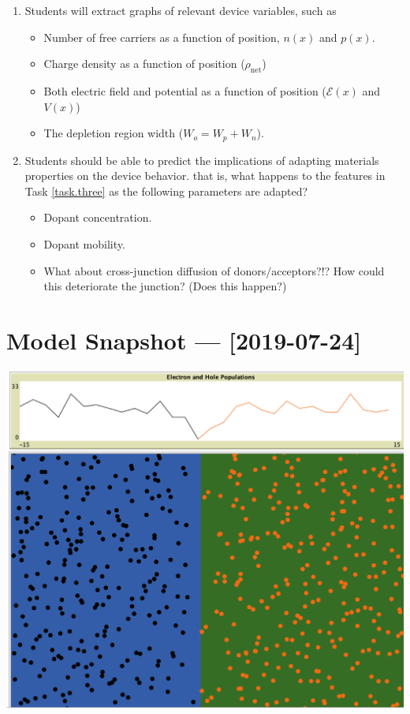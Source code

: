 \documentclass[12pt]{exam}
\begin{document}
\begin{enumerate}
    \item Students will extract graphs of relevant device variables, such as \label{task.three}
        \begin{itemize}
            \item Number of free carriers as a function of position, $n(x)$ and $p(x)$.
            \item Charge density as a function of position ($\rho_{\mathrm{net}}$)
            \item Both electric field and potential as a function of position ($\mathcal{E}(x)$ and $V(x)$)
            \item The depletion region width ($W_o = W_p + W_n$).
        \end{itemize}
    \item Students should be able to predict the implications of adapting materials properties on the device behavior. that is, what happens to the features in Task \ref{task.three} as the following parameters are adapted?
        \begin{itemize}
            \item Dopant concentration.
            \item Dopant mobility.
            \item What about cross-junction diffusion of donors/acceptors?!? How could this deteriorate the junction? (Does this happen?)
        \end{itemize}
\end{enumerate}

\section{Model Snapshot --- [2019-07-24]}

\begin{center}
\includegraphics[width=0.8\columnwidth]{Figures/ModelSnapshot-2019-07-24}
\end{center}
\end{document}
